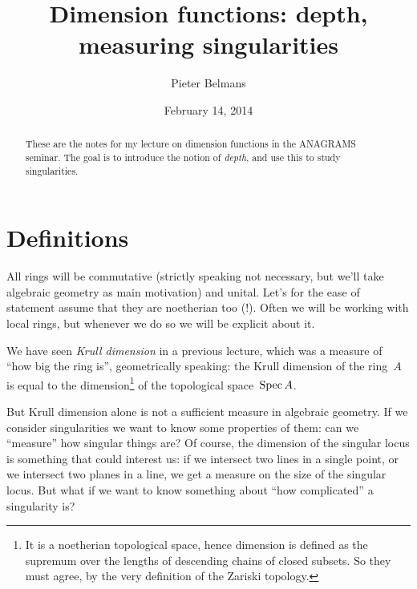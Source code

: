 \documentclass[10pt,a4paper]{article}
\title{Dimension functions: depth, measuring singularities}
\author{Pieter Belmans}
\date{February 14, 2014}
\begin{document}
\maketitle

\begin{abstract}
  These are the notes for my lecture on dimension functions in the ANAGRAMS seminar. The goal is to introduce the notion of \emph{depth}, and use this to study singularities.
\end{abstract}

\tableofcontents

\clearpage

\section{Definitions}
All rings will be commutative (strictly speaking not necessary, but we'll take algebraic geometry as main motivation) and unital. Let's for the ease of statement assume that they are noetherian too (!). Often we will be working with local rings, but whenever we do so we will be explicit about it.

We have seen \emph{Krull dimension} in a previous lecture, which was a measure of ``how big the ring is'', geometrically speaking: the Krull dimension of the ring~$A$ is equal to the dimension\footnote{It is a noetherian topological space, hence dimension is defined as the supremum over the lengths of descending chains of closed subsets. So they must agree, by the very definition of the Zariski topology.} of the topological space~$\operatorname{Spec} A$.

But Krull dimension alone is not a sufficient measure in algebraic geometry. If we consider singularities we want to know some properties of them: can we ``measure'' how singular things are? Of course, the dimension of the singular locus is something that could interest us: if we intersect two lines in a single point, or we intersect two planes in a line, we get a measure on the size of the singular locus. But what if we want to know something about ``how complicated'' a singularity is?
\end{document}

